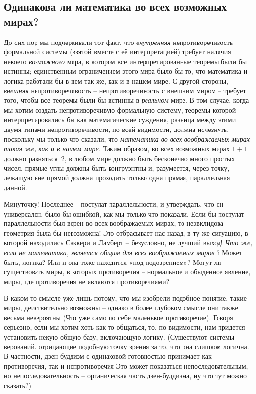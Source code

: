 \documentclass[../main.tex]{subfiles}
\begin{document}
\subsection{Одинакова ли математика во всех возможных мирах?}

До сих пор мы подчеркивали тот факт, что \emph{внутренняя} непротиворечивость формальной системы (взятой вместе с её интерпретацией) требует наличия некоего \emph{возможного} мира, в котором все интерпретированные теоремы были бы истинны; единственным ограничением этого мира было бы то, что математика и логика работали бы в нем так же, как и в нашем мире. С другой стороны, \emph{внешняя} непротиворечивость \--- непротиворечивость с внешним миром \--- требует того, чтобы все теоремы были бы истинны в \emph{реальном} мире. В том случае, когда мы хотим создать непротиворечивую формальную систему, теоремы которой интерпретировались бы как математические суждения, разница между этими двумя типами непротиворечивости, по всей видимости, должна исчезнуть, поскольку мы только что сказали, что \emph{математика во всех воображаемых мирах такая же, как и в нашем мире.} Таким образом, во всех возможных мирах $1 + 1$ должно равняться~$2$, в любом мире должно быть бесконечно много простых чисел, прямые углы должны быть конгруэнтны и, разумеется, через точку, лежащую вне прямой должна проходить только одна прямая, параллельная данной.

Минуточку! Последнее \--- постулат параллельности, и утверждать, что он универсален, было бы ошибкой, как мы только что показали. Если бы постулат параллельности был верен во всех воображаемых мирах, то неэвклидова геометрия была бы невозможна! Это отбрасывает нас назад, в ту же ситуацию, в которой находились Саккери и Ламберт \--- безусловно, не лучший выход! \emph{Что же, если не математика, является общим для всех воображаемых миров} ? Может быть, логика? Или и она тоже находится «под подозрением»? Могут ли существовать миры, в которых противоречия \--- нормальное и обыденное явление, миры, где противоречия не являются противоречиями?

В каком-то смысле уже лишь потому, что мы изобрели подобное понятие, такие миры, действительно возможны \--- однако в более глубоком смысле они также весьма невероятны (Что уже само по себе маленькое противоречие). Говоря серьезно, если мы хотим хоть как-то общаться, то, по видимости, нам придется установить некую общую базу, включающую логику. (Существуют системы верований, отрицающие подобную точку зрения за то, что она слишком логична. В частности, дзен-буддизм с одинаковой готовностью принимает как противоречия, так и непротиворечия Это может показаться непоследовательным, но непоследовательность \--- органическая часть дзен-буддизма, ну что тут можно сказать?)
\end{document}
